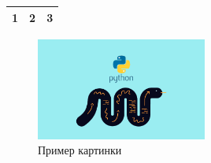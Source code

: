 \documentclass{article}
\begin{document}
    \begin{tabular}{|c|c|c|}
        \hline
        1 & 2 & 3 \\
        \hline
    \end{tabular}
    \begin{figure}
        \centering
        \includegraphics[width=0.5\textwidth]{image.jpg}
        \caption{Пример картинки}
        \label{fig:example}
    \end{figure}
\end{document}

